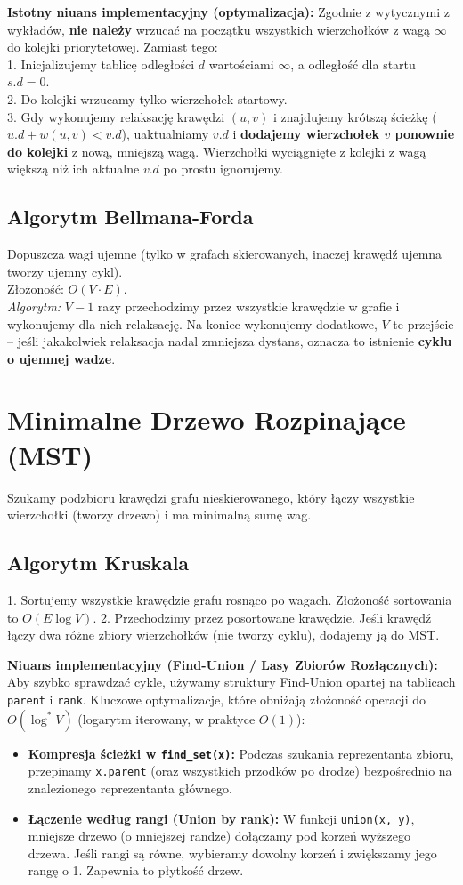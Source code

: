 \documentclass[12pt, a4paper]{article}
\begin{document}
\textbf{Istotny niuans implementacyjny (optymalizacja):}
Zgodnie z wytycznymi z wykładów, \textbf{nie należy} wrzucać na początku wszystkich wierzchołków z wagą $\infty$ do kolejki priorytetowej. Zamiast tego: \\
1. Inicjalizujemy tablicę odległości $d$ wartościami $\infty$, a odległość dla startu $s.d = 0$. \\
2. Do kolejki wrzucamy tylko wierzchołek startowy. \\
3. Gdy wykonujemy relaksację krawędzi $(u, v)$ i znajdujemy krótszą ścieżkę ($u.d + w(u,v) < v.d$), uaktualniamy $v.d$ i \textbf{dodajemy wierzchołek $v$ ponownie do kolejki} z nową, mniejszą wagą. Wierzchołki wyciągnięte z kolejki z wagą większą niż ich aktualne $v.d$ po prostu ignorujemy.

\subsection{Algorytm Bellmana-Forda}
Dopuszcza wagi ujemne (tylko w grafach skierowanych, inaczej krawędź ujemna tworzy ujemny cykl).\\ Złożoność: $O(V \cdot E)$.\\
\textit{Algorytm:} $V-1$ razy przechodzimy przez wszystkie krawędzie w grafie i wykonujemy dla nich relaksację. Na koniec wykonujemy dodatkowe, $V$-te przejście -- jeśli jakakolwiek relaksacja nadal zmniejsza dystans, oznacza to istnienie \textbf{cyklu o ujemnej wadze}.

\section{Minimalne Drzewo Rozpinające (MST)}
Szukamy podzbioru krawędzi grafu nieskierowanego, który łączy wszystkie wierzchołki (tworzy drzewo) i ma minimalną sumę wag.

\subsection{Algorytm Kruskala}
1. Sortujemy wszystkie krawędzie grafu rosnąco po wagach. Złożoność sortowania to $O(E \log V)$.
2. Przechodzimy przez posortowane krawędzie. Jeśli krawędź łączy dwa różne zbiory wierzchołków (nie tworzy cyklu), dodajemy ją do MST.

\textbf{Niuans implementacyjny (Find-Union / Lasy Zbiorów Rozłącznych):}
Aby szybko sprawdzać cykle, używamy struktury Find-Union opartej na tablicach \texttt{parent} i \texttt{rank}. 
Kluczowe optymalizacje, które obniżają złożoność operacji do $O(\log^* V)$ (logarytm iterowany, w praktyce $O(1)$):
\begin{itemize}
    \item \textbf{Kompresja ścieżki w \texttt{find\_set(x)}:} Podczas szukania reprezentanta zbioru, przepinamy \texttt{x.parent} (oraz wszystkich przodków po drodze) bezpośrednio na znalezionego reprezentanta głównego.
    \item \textbf{Łączenie według rangi (Union by rank):} W funkcji \texttt{union(x, y)}, mniejsze drzewo (o mniejszej randze) dołączamy pod korzeń wyższego drzewa. Jeśli rangi są równe, wybieramy dowolny korzeń i zwiększamy jego rangę o 1. Zapewnia to płytkość drzew.
\end{itemize}
\end{document}
